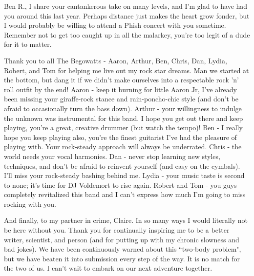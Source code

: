 Ben R., I share your cantankerous take on many levels, and I'm glad to have had you around this last year. Perhaps distance just makes the heart grow fonder, but I would probably be willing to attend a Phish concert with you sometime. Remember not to get too caught up in all the malarkey, you're too legit of a dude for it to matter.

Thank you to all The Begowatts - Aaron, Arthur, Ben, Chris, Dan, Lydia, Robert, and Tom for helping me live out my rock star dreams. Man we started at the bottom, but dang it if we didn't make ourselves into a respectable rock 'n' roll outfit by the end! Aaron - keep it burning for little Aaron Jr, I've already been missing your giraffe-rock stance and rain-poncho-chic style (and don't be afraid to occasionally turn the bass down). Arthur - your willingness to indulge the unknown was instrumental for this band. I hope you get out there and keep playing, you're a great, creative drummer (but watch the tempo)! Ben - I really hope you keep playing also, you're the finest guitarist I've had the pleasure of playing with. Your rock-steady approach will always be underrated. Chris - the world needs your vocal harmonies. Dan - never stop learning new styles, techniques, and don't be afraid to reinvent yourself (and easy on the cymbals). I'll miss your rock-steady bashing behind me. Lydia - your music taste is second to none; it's time for DJ Voldemort to rise again. Robert and Tom - you guys completely revitalized this band and I can't express how much I'm going to miss rocking with you. 

And finally, to my partner in crime, Claire. In so many ways I would literally not be here without you. Thank you for continually inspiring me to be a better writer, scientist, and person (and for putting up with my chronic slowness and bad jokes). We have been continuously warned about this ``two-body problem", but we have beaten it into submission every step of the way. It is no match for the two of us. I can't wait to embark on our next adventure together. 